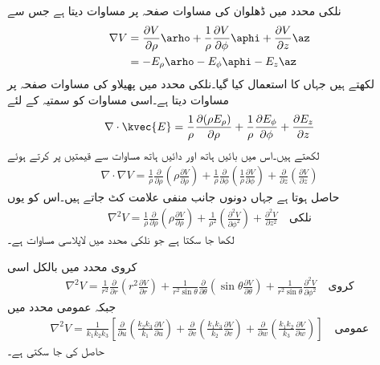 نلکی محدد میں ڈھلوان کی مساوات صفحہ  پر مساوات  دیتا ہے جس سے 
\begin{gather}
\begin{aligned}\label{مساوات_لاپلاس_نلکی_پھیلاو_الف}
\nabla V &= \frac{\partial V}{\partial \rho} \arho+\frac{1}{\rho}\frac{\partial V}{\partial \phi}  \aphi+\frac{\partial V}{\partial z}\az\\
&=-E_\rho \arho-E_\phi \aphi-E_z \az 
\end{aligned}
\end{gather}
لکھتے  ہیں جہاں  کا استعمال کیا گیا۔نلکی محدد میں پھیلاو کی مساوات صفحہ  پر مساوات  دیتا ہے۔اسی مساوات کو سمتیہ  کے لئے
 \begin{align*}
\nabla \cdot \kvec{E}=\frac{1}{\rho}\frac{\partial (\rho E_{\rho})}{\partial \rho}+\frac{1}{\rho}\frac{\partial E_{\phi}}{\partial \phi}  +  \frac{\partial E_{z}}{\partial z}
\end{align*}
لکھتے ہیں۔اس میں بائیں ہاتھ   اور دائیں ہاتھ مساوات  سے قیمتیں پر کرتے ہوئے
\begin{align*}
\nabla \cdot \nabla V=\frac{1}{\rho}\frac{\partial }{\partial \rho}\left(\rho \frac{\partial V}{\partial \rho}\right)
+\frac{1}{\rho}\frac{\partial }{\partial \phi}\left(\frac{1}{\rho}\frac{\partial V}{\partial \phi}  \right) 
+  \frac{\partial}{\partial z} \left(\frac{\partial V}{\partial z} \right)
\end{align*}
حاصل ہوتا ہے جہاں دونوں جانب منفی علامت کٹ جاتے ہیں۔اس کو یوں
\begin{align}
\nabla^2 V=\frac{1}{\rho}\frac{\partial }{\partial \rho}\left(\rho \frac{\partial V}{\partial \rho}\right)
+\frac{1}{\rho^2}\left(\frac{\partial^2 V}{\partial \phi^2}  \right) 
+  \frac{\partial^2 V}{\partial z^2}\quad {\textrm{نلکی}}
\end{align}
 لکھا جا سکتا ہے جو نلکی محدد میں لاپلاسی مساوات ہے۔

کروی محدد میں بالکل اسی
\begin{align}\label{مساوات_لاپلاس_کروی_لاپلاسی}
\nabla^2 V=\frac{1}{r^2} \frac{\partial}{\partial r} \left(r^2\frac{\partial V}{\partial r} \right)+\frac{1}{r^2 \sin \theta} \frac{\partial}{\partial \theta} \left(\sin \theta \frac{\partial V}{\partial \theta}  \right)+\frac{1}{r^2 \sin \theta}\frac{\partial^2 V}{\partial \phi^2} \quad {\textrm{کروی}}
\end{align}
جبکہ عمومی محدد میں
\begin{align}\label{مساوات_لاپلاس_عمومی_لاپلاسی}
\nabla^2 V=\frac{1}{k_1 k_2 k_3}\left[\frac{\partial}{\partial u}\left(\frac{k_2 k_3}{k_1}\frac{\partial V}{\partial u} \right)+\frac{\partial}{\partial v}\left(\frac{k_1 k_3}{k_2}\frac{\partial V}{\partial v} \right) +\frac{\partial}{\partial w}\left(\frac{k_1 k_2}{k_3}\frac{\partial V}{\partial w} \right)\right] \quad{\textrm{عمومی}}
\end{align}
حاصل کی جا سکتی ہے۔

